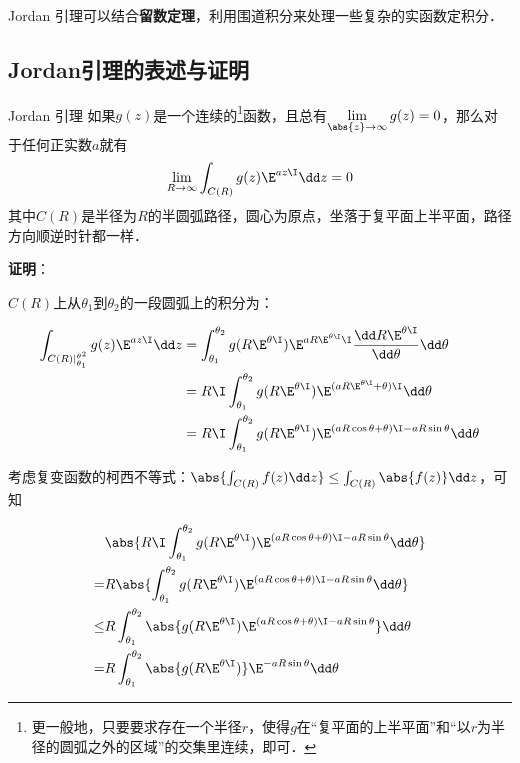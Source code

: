 



Jordan 引理可以结合\textbf{留数定理}，利用围道积分来处理一些复杂的实函数定积分．

\subsection{Jordan引理的表述与证明}

\begin{theorem}{Jordan 引理}\label{JdLem_the1}
如果$g(z)$是一个连续的\footnote{更一般地，只要要求存在一个半径$r$，使得$g$在“复平面的上半平面”和“以$r$为半径的圆弧之外的区域”的交集里连续，即可．}函数，且总有$\lim\limits_{\abs{z}\to\infty}g(z)=0$，那么对于任何正实数$a$就有
\begin{equation}
\lim\limits_{R\to \infty}\int_{C(R)}g(z)\E^{az\I}\dd z=0
\end{equation}
其中$C(R)$是半径为$R$的半圆弧路径，圆心为原点，坐落于复平面上半平面，路径方向顺逆时针都一样．


\end{theorem}

\textbf{证明}：

$C(R)$上从$\theta_1$到$\theta_2$的一段圆弧上的积分为：

\begin{equation}
\begin{aligned}
\int_{C(R)|_{\theta_1}^{\theta^2}}g(z)\E^{az\I}\dd z&=\int_{\theta_1}^{\theta_2}g( R\E^{\theta\I} )\E^{aR\E^{\theta\I}\I}\frac{\dd R\E^{\theta\I}}{\dd \theta}\dd\theta\\
&=R\I\int_{\theta_1}^{\theta_2}g(R\E^{\theta\I})\E^{(aR\E^{\theta\I}+\theta)\I}\dd\theta\\
&=R\I\int_{\theta_1}^{\theta_2}g(R\E^{\theta\I})\E^{(aR\cos\theta+\theta)\I-aR\sin\theta}\dd\theta
\end{aligned}
\end{equation}

考虑复变函数的柯西不等式：$\abs{\int_{C(R)}f(z)\dd z} \leq \int_{C(R)}\abs{f(z)}\dd z$，可知

\begin{equation}\label{JdLem_eq4}
\begin{aligned}
&\abs{R\I\int_{\theta_1}^{\theta_2}g(R\E^{\theta\I})\E^{(aR\cos\theta+\theta)\I-aR\sin\theta}\dd\theta}\\
=&R\abs{\int_{\theta_1}^{\theta_2}g(R\E^{\theta\I})\E^{(aR\cos\theta+\theta)\I-aR\sin\theta}\dd\theta}\\
\leq&R\int_{\theta_1}^{\theta_2}\abs{g(R\E^{\theta\I})\E^{(aR\cos\theta+\theta)\I-aR\sin\theta}}\dd\theta\\
=&R\int_{\theta_1}^{\theta_2}\abs{g(R\E^{\theta\I})}\E^{-aR\sin\theta}\dd\theta
\end{aligned}
\end{equation}

